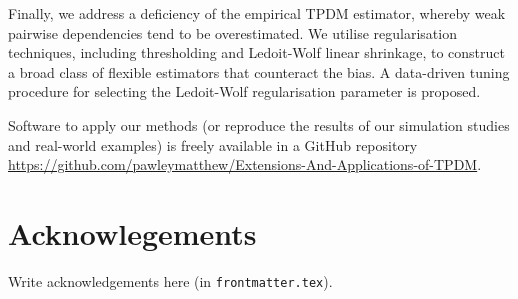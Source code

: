 Finally, we address a deficiency of the empirical TPDM estimator, whereby weak pairwise dependencies tend to be overestimated.
We utilise regularisation techniques, including thresholding and Ledoit-Wolf linear shrinkage, to construct a broad class of flexible estimators that counteract the bias.
A data-driven tuning procedure for selecting the Ledoit-Wolf regularisation parameter is proposed.

Software to apply our methods (or reproduce the results of our simulation studies and real-world examples) is freely available in a GitHub repository \url{https://github.com/pawleymatthew/Extensions-And-Applications-of-TPDM}.

\newpage

\chapter*{Acknowlegements}

Write acknowledgements here (in \texttt{frontmatter.tex}).

\newpage

\setcounter{page}{6} %

\tableofcontents
\newpage
\listoffigures
\newpage
\listoftables

\newpage
{} %